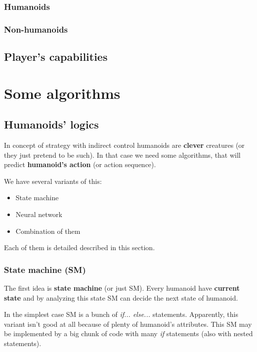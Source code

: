 \documentclass[12pt]{article}
\begin{document}
            \subsubsection{Humanoids}
            \subsubsection{Non-humanoids}
        \subsection{Player's capabilities}

    \section{Some algorithms}
        \subsection{Humanoids' logics}
            In concept of strategy with indirect control humanoids are \textbf{clever} creatures (or they just pretend to be such). In that case we need some algorithms, that will predict \textbf{humanoid's action} (or action sequence).

            We have several variants of this:
                \begin{itemize}
                    \item State machine
                    \item Neural network
                    \item Combination of them
                \end{itemize}

            Each of them is detailed described in this section.

            \subsubsection{State machine (SM)}
                The first idea is \textbf{state machine} (or just SM). Every humanoid have \textbf{current state} and by analyzing this state SM can decide the next state of humanoid.

                In the simplest case SM is a bunch of \textit{if... else...} statements. Apparently, this variant isn't good at all because of plenty of humanoid's attributes. This SM may be implemented by a big chunk of code with many \textit{if} statements (also with nested statements).
\end{document}
